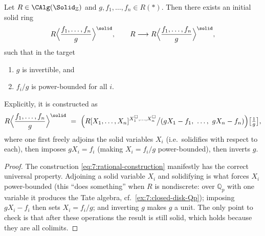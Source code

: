 \begin{theorem}
\label{thm:7:rational-localization}
Let $R\in\CAlg(\Solid_{\mathbb{Z}})$ and $g,f_1,\dots,f_n\in R(\ast)$. Then
there exists an initial solid ring
\begin{equation*}
R\Bigl\langle\frac{f_1,\dots,f_n}{g}\Bigr\rangle^{\solid},\qquad
R\longrightarrow R\Bigl\langle\frac{f_1,\dots,f_n}{g}\Bigr\rangle^{\solid},
\end{equation*}
such that in the target
\begin{enumerate}
\item $g$ is invertible, and
\item $f_i/g$ is power-bounded for all $i$.
\end{enumerate}
Explicitly, it is constructed as
\begin{equation}
\label{eq:7:rational-construction}
R\Bigl\langle\frac{f_1,\dots,f_n}{g}\Bigr\rangle^{\solid}\ =\
\Bigl(R[X_1,\dots,X_n]^{X_1^{\square},\dots,X_n^{\square}}\big/
(gX_1-f_1,\ \dots,\ gX_n-f_n)\Bigr)\bigl[\tfrac1g\bigr],
\end{equation}
where one first freely adjoins the solid variables $X_i$ (i.e.\ solidifies with
respect to each), then imposes $gX_i=f_i$ (making $X_i=f_i/g$ power-bounded),
then inverts $g$.
\end{theorem}

\begin{proof}
The construction \eqref{eq:7:rational-construction} manifestly has the correct
universal property. Adjoining a solid variable $X_i$ and solidifying is what
forces $X_i$ power-bounded (this ``does something'' when $R$ is nondiscrete:
over $\mathbb{Q}_p$ with one variable it produces the Tate algebra, cf.\
\cref{ex:7:closed-disk-Qp}); imposing $gX_i-f_i$ then sets $X_i=f_i/g$; and
inverting $g$ makes $g$ a unit. The only point to check is that after these
operations the result is still solid, which holds because they are all
colimits.
\end{proof}

